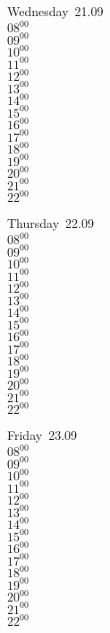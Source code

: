 \documentclass[11pt,a4paper]{book}\usepackage[]{graphicx}\usepackage[]{color}
\begin{document}
\begin{weekdaybox}
  Wednesday~21.09\\
  { 
  \vfill
  $08^{00}$\\
$09^{00}$\\
$10^{00}$\\
$11^{00}$\\
$12^{00}$\\
$13^{00}$\\
$14^{00}$\\
$15^{00}$\\
$16^{00}$\\
$17^{00}$\\
$18^{00}$\\
$19^{00}$\\
$20^{00}$\\
$21^{00}$\\
$22^{00}$\\
  }
\end{weekdaybox}
\clearpage
\begin{headerbox}
\end{headerbox}
\begin{weekdaybox}
  Thursday~22.09\\
  { 
  \vfill
  $08^{00}$\\
$09^{00}$\\
$10^{00}$\\
$11^{00}$\\
$12^{00}$\\
$13^{00}$\\
$14^{00}$\\
$15^{00}$\\
$16^{00}$\\
$17^{00}$\\
$18^{00}$\\
$19^{00}$\\
$20^{00}$\\
$21^{00}$\\
$22^{00}$\\
  }
\end{weekdaybox} 
\begin{weekdaybox}
  Friday~23.09\\
  { 
  \vfill
  $08^{00}$\\
$09^{00}$\\
$10^{00}$\\
$11^{00}$\\
$12^{00}$\\
$13^{00}$\\
$14^{00}$\\
$15^{00}$\\
$16^{00}$\\
$17^{00}$\\
$18^{00}$\\
$19^{00}$\\
$20^{00}$\\
$21^{00}$\\
$22^{00}$\\
  }
\end{weekdaybox}
\end{document}
